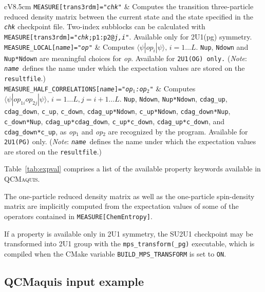 \documentclass[bibliography=totoc,12pt,a4paper]{scrartcl}
\newcommand{\qcm}{\textsc{QCMaquis}}
\begin{document}
\begin{table}
\begin{tabular}{cV{8.5cm}}
	\texttt{MEASURE[trans3rdm]="\textit{chk}"}
			& Computes the transition three-particle reduced density matrix between the 
			  current state and the state specified in the \texttt{\textit{chk}} checkpoint file. Two-index subblocks can be calculated with \texttt{MEASURE[trans3rdm]="\textit{chk};p1:p2@\textit{j,i}"}. 
			  Available only for 2U1(pg) symmetry. \\
	\texttt{MEASURE\_LOCAL[\textit{name}]="\textit{op}"}
			& Computes $\langle \psi | op_i | \psi \rangle, \, i = 1 \ldots L$. \texttt{Nup}, \texttt{Ndown} and \texttt{Nup*Ndown} are meaningful choices for \textit{op}. Available for \texttt{2U1(OG) only.}  (\emph{Note}: \texttt{\textit{name}}\ defines the name under which the expectation values are stored on the \texttt{resultfile}.) \\
	\texttt{MEASURE\_HALF}\texttt{\_CORRELATIONS[\textit{name}]="\textit{op$_1$:op$_2$}"}
			& Computes $\langle \psi | op_{1i} op_{2j}| \psi \rangle, \, i = 1 \ldots L, j=i+1 \ldots L$. \texttt{Nup}, \texttt{Ndown}, \texttt{Nup*Ndown}, \texttt{cdag\_up}, \texttt{cdag\_down}, \texttt{c\_up}, \texttt{c\_down}, \texttt{cdag\_up*Ndown}, \texttt{c\_up*Ndown}, \texttt{cdag\_down*Nup}, \texttt{c\_down*Nup}, \texttt{cdag\_up*cdag\_down}, \texttt{c\_up*c\_down}, \texttt{cdag\_up*c\_down}, and \texttt{cdag\_down*c\_up}, as \textit{op$_1$} and \textit{op$_2$} are recognized by the program. Available for \texttt{2U1(PG)} only. (\emph{Note}: \texttt{\textit{name}}\ defines the name under which the expectation values are stored on the \texttt{resultfile}.) \\
	\bottomrule
  \end{tabular}
\end{table}

Table~\ref{tab:expval} comprises a list of the available property keywords available in \qcm.

The one-particle reduced density matrix as well as the one-particle spin-density matrix are implicitly computed from the expectation values of some of the operators contained in \texttt{MEASURE[ChemEntropy]}.

If a property is available only in 2U1 symmetry, the SU2U1 checkpoint may be transformed into 2U1 group with the \texttt{mps\_transform(\_pg)} executable, which is compiled when the CMake variable \texttt{BUILD\_MPS\_TRANSFORM} is set to \texttt{ON}.

\clearpage

\subsection{QCMaquis input example}
\label{sec:input-qcm}
\end{document}

